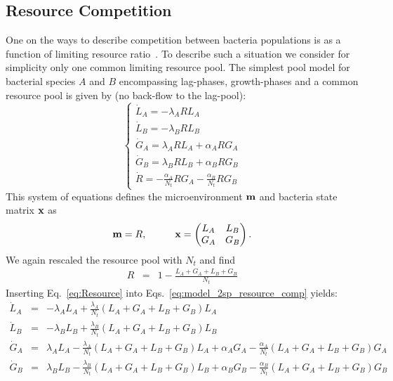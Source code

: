 \documentclass[10pt,A4paper]{article}
\begin{document}
\subsection{Resource Competition}
One on the ways to describe competition between bacteria populations is as a function of limiting resource ratio~\cite{tilman_resource_1977, smith_effects_2002}.
To describe such a situation we consider for simplicity only one common limiting resource pool.
The simplest pool model for bacterial species $A$ and $B$ encompassing lag-phases, growth-phases and a common resource pool is given by (no back-flow to the lag-pool):
\begin{equation}
    \begin{cases}
        \dot{L}_A = - \lambda_A R L_A\\
        \dot{L}_B = - \lambda_B R L_B \\
        \dot{G}_A = \lambda_A R L_A +\alpha_A R G_A\\
        \dot{G}_B = \lambda_B R L_B +\alpha_B R G_B\\
        \dot{R} =-\frac{\alpha_A}{N_t} R G_A-\frac{\alpha_B}{N_t} R G_B
    \end{cases}
    \label{eq:model_2sp_resource_comp}
\end{equation}
This system of equations defines the microenvironment $\mathbf{m}$ and bacteria state matrix $\mathbf{x}$ as
\begin{equation}
    \mathbf{m} = R, \hspace{1cm}
    \mathbf{x} = \begin{pmatrix}
        L_A & L_B \\
        G_A & G_B 
    \end{pmatrix}.
\end{equation}
We again rescaled the resource pool with $N_t$ and find
\begin{eqnarray}
\label{eq:Resource}
R &=&1-\frac{L_A+G_A+L_B+G_B}{N_t}
\end{eqnarray}
Inserting Eq.~\ref{eq:Resource} into Eqs.~\ref{eq:model_2sp_resource_comp} yields:
\begin{eqnarray*}
    \dot{L}_A &=& - \lambda_A  L_A + \frac{\lambda_A}{N_t}\left(L_A+G_A+L_B+G_B\right)L_A\\
    \dot{L}_B &=& - \lambda_B L_B + \frac{\lambda_B}{N_t}\left(L_A+G_A+L_B+G_B\right)L_B \\
    \dot{G}_A &=&  \lambda_A  L_A - \frac{\lambda_A}{N_t}\left(L_A+G_A+L_B+G_B\right)L_A +\alpha_A G_A - \frac{\alpha_A}{N_t}\left(L_A+G_A+L_B+G_B\right)G_A\\
    \dot{G}_B &=&  \lambda_B L_B - \frac{\lambda_B}{N_t}\left(L_A+G_A+L_B+G_B\right)L_B  +\alpha_B G_B -\frac{\alpha_B}{N_t}\left(L_A+G_A+L_B+G_B\right)G_B
\end{eqnarray*}
\end{document}
